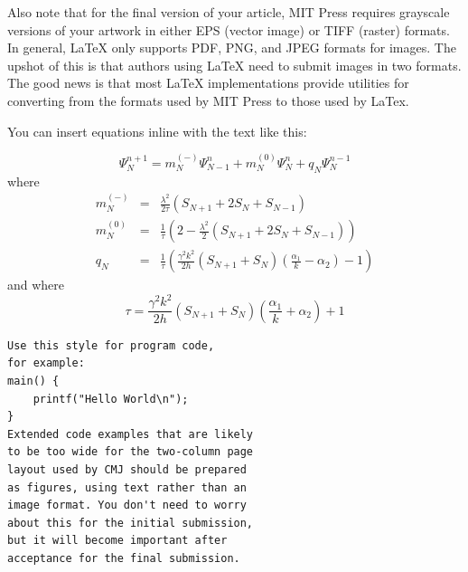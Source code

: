 \documentclass[letterpaper, 12pt]{article}
\begin{document}
Also note that for the final version of your article, MIT Press requires grayscale versions of your artwork in either EPS (vector image) or TIFF (raster) formats.
In general, LaTeX only supports PDF, PNG, and JPEG formats for images.
The upshot of this is that authors using LaTeX need to submit images in two formats.
The good news is that most LaTeX implementations provide utilities for converting from the formats used by MIT Press to those used by LaTex.

You can insert equations inline with the text like this:

\begin{equation}
	\label{radupdate}
		\Psi_{N}^{n+1} = m_{N}^{(-)}\Psi_{N-1}^{n}+m_{N}^{(0)}\Psi_{N}^{n} + q_{N}\Psi_{N}^{n-1}
\end{equation}
where
\begin{eqnarray*}
	m_{N}^{(-)} &=& \frac{\lambda^2}{2\tau}\left(S_{N+1}+2S_{N}+S_{N-1}\right)\\
	m_{N}^{(0)} &=& \frac{1}{\tau}\left(2-\frac{\lambda^2}{2}\left(S_{N+1}+2S_{N}+S_{N-1}\right)\right)\\
	q_{N} &=& \frac{1}{\tau}\left(\frac{\gamma^2 k^2}{2h}\left(S_{N+1}+S_{N}\right)\left(\frac{\alpha_{1}}{k}-	\alpha_{2}\right)-1\right)
\end{eqnarray*}
and where 
\begin{equation*}
	\tau = \frac{\gamma^2 k^2}{2h}\left(S_{N+1}+S_{N}\right)\left(\frac{\alpha_{1}}{k}+\alpha_{2}\right)+1
\end{equation*}

%
\begin{Verbatim}[fontfamily=courier, xleftmargin=\parindent]
Use this style for program code, 
for example:
main() {
    printf("Hello World\n");    
}
Extended code examples that are likely
to be too wide for the two-column page
layout used by CMJ should be prepared
as figures, using text rather than an
image format. You don't need to worry
about this for the initial submission, 
but it will become important after 
acceptance for the final submission.
\end{Verbatim}
\end{document}
